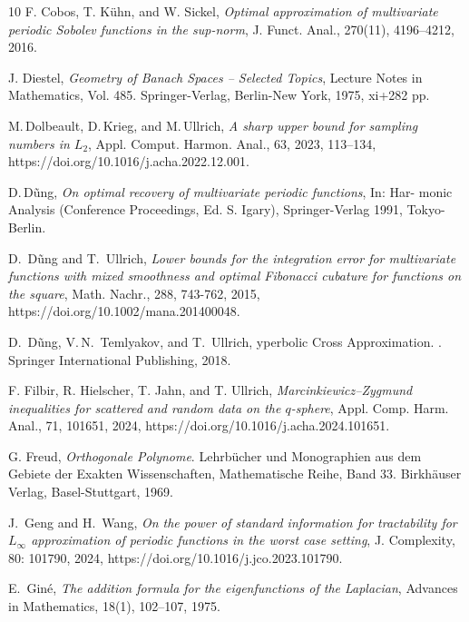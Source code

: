 \documentclass[a4paper,12pt]{amsart}
\theoremstyle{definition}
\theoremstyle{remark}
\begin{document}
{\begin{thebibliography}{10}
 F. Cobos, T. Kühn, and  W. Sickel, 
{\it Optimal approximation of multivariate periodic
Sobolev functions in the sup-norm},
J. Funct. Anal., 270(11), 4196--4212, 2016.


J. Diestel, 
{\it Geometry of Banach Spaces -- Selected Topics}, 
Lecture Notes in Mathematics, Vol. 485. Springer-Verlag, Berlin-New York, 
1975, xi+282 pp.

 M.\,Dolbeault, D.\,Krieg, and M.\,Ullrich,  
{\it A sharp upper bound for sampling numbers in $L_2$}, 
Appl. Comput. Harmon. Anal.,  63, 2023, 
			113--134,
			https://doi.org/10.1016/j.acha.2022.12.001. 


 D.\,D{\~u}ng, {\it On optimal recovery of multivariate periodic functions}, In: Har-
monic Analysis (Conference Proceedings, Ed. S. Igary), Springer-Verlag
1991, Tokyo-Berlin.

{
{D.}~D\~ung and T.~Ullrich, 
{\it
Lower bounds for the integration error for multivariate functions with mixed smoothness and optimal Fibonacci cubature for functions on the square},
Math. Nachr., 288, 743-762, 2015, https://doi.org/10.1002/mana.201400048.
}

{D.}~D\~ung, V.\,N.~Temlyakov, and T.~Ullrich,
yperbolic {C}ross {A}pproximation.
.
  Springer International Publishing, 2018.


 F. Filbir, R. Hielscher, T. Jahn, and T. Ullrich, {\it Marcinkiewicz--Zygmund inequalities for scattered and random data on the $q$-sphere}, %
{Appl. Comp. Harm. Anal., 71, 101651, 2024, https://doi.org/10.1016/j.acha.2024.101651.}


 G. Freud,
{\it Orthogonale Polynome}. Lehrbücher und Monographien aus dem Gebiete
der Exakten Wissenschaften, Mathematische Reihe, Band 33. Birkh\"auser Verlag, Basel-Stuttgart, 1969.


J.~Geng and H.~Wang, 
{\it On the power of standard information for tractability for $L_\infty$ approximation of periodic functions in the worst case setting}, 
{J. Complexity, 80: 101790, 2024, https://doi.org/10.1016/j.jco.2023.101790.}

E.~Gin\'e, {\it The addition formula for the eigenfunctions of the Laplacian},
Advances in Mathematics, 18(1), 102--107, 1975.



\end{thebibliography}}
\end{document}
